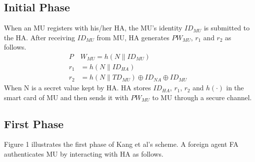 \documentclass[UTF8]{ctexart}
\begin{document}
\subsection{Initial Phase}
When an MU registers with his/her HA, the MU's identity $ID_{MU}$ is submitted to the HA. After receiving $ID_{MU}$ from MU, HA generates $PW_{MU}$, $r_1$ and $r_2$ as follows.
\begin{align}
    P&W_{MU}=h(N\|ID_{MU}) \\
    r_1&=h(N\|ID_{HA})\\
    r_2&=h(N\|TD_{MU})\oplus{ID_{NA}}\oplus{ID_{MU}}
\end{align}
When N is a secret value kept by HA. HA stores $ID_{HA}$, $r_1$, $r_2$ and $h(\cdot)$ in the smart card of MU and then sends it with $PW_{MU}$ to MU through a secure channel.
\subsection{First Phase}
Figure 1 illustrates the first phase of Kang et al's scheme. A foreign agent FA authenticates MU by interacting with HA as follows.
\end{document}
